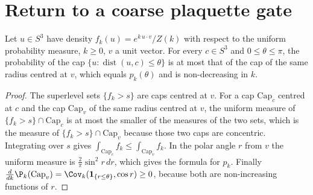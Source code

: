 \section{Return to a coarse plaquette gate}\label{s:ret}
\begin{lemma}\label{l:cap}
Let $u\in S^3$ have density $f_k(u)=e^{k\,u\cdot v}/Z(k)$ with respect to the uniform probability measure,
$k\ge0$, $v$ a unit vector. For every $c\in S^3$ and $0\le\theta\le\pi$, the probability of the cap
$\{u:\operatorname{dist}(u,c)\le\theta\}$ is at most that of the cap of the same radius centred at $v$, which
equals $p_k(\theta)$ and is non-decreasing in $k$.
\end{lemma}
\begin{proof}
The superlevel sets $\{f_k>s\}$ are caps centred at $v$. For a cap $\mathrm{Cap}_c$ centred at $c$ and the cap $\mathrm{Cap}_v$ of the
same radius centred at $v$, the uniform measure of $\{f_k>s\}\cap\mathrm{Cap}_c$ is at most the smaller of the measures of
the two sets, which is the measure of $\{f_k>s\}\cap\mathrm{Cap}_v$ because those two caps are concentric. Integrating
over $s$ gives $\int_{\mathrm{Cap}_c}f_k\le\int_{\mathrm{Cap}_v}f_k$. In the polar angle $r$ from $v$ the uniform measure is
$\tfrac2\pi\sin^2r\,dr$, which gives the formula for $p_k$. Finally $\frac{d}{dk}\P_k(\mathrm{Cap}_v)=
\Cov_k(\mathbf 1_{\{r\le\theta\}},\cos r)\ge0$, because both are non-increasing functions of $r$.
\end{proof}

